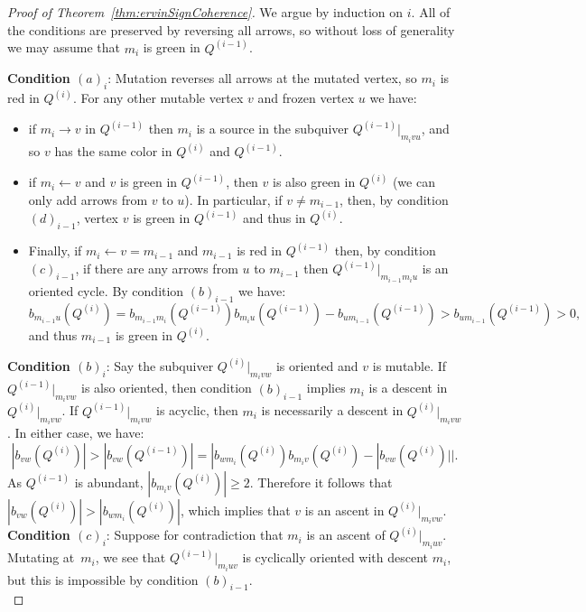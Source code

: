 \documentclass[12pt]{amsart}
\theoremstyle{definition}
\theoremstyle{remark}
\numberwithin{equation}{section}
\begin{document}
\begin{proof}[Proof of Theorem~\ref{thm:ervinSignCoherence}]
We argue by induction on $i$. 
All of the conditions are preserved by reversing all arrows, so without loss of generality we may assume that $m_i$ is green in $Q^{(i-1)}$. %


\textbf{Condition $(a)_i$}: 
Mutation reverses all arrows at the mutated vertex, so $m_i$ is red in $Q^{(i)}$.
For any other mutable vertex $v$ and frozen vertex $u$ we have:
\begin{itemize}
\item if $m_i \rightarrow v$ in $Q^{(i-1)}$ then $m_i$ is a source in the subquiver $Q^{(i-1)}|_{m_ivu}$, and so $v$ has the same color in $Q^{(i)}$ and $Q^{(i-1)}$. 
\item if $m_i \leftarrow v$ and $v$ is green in $Q^{(i-1)}$, then $v$ is also green in $Q^{(i)}$ (we can only add arrows from $v$ to $u$). In particular, if $v \neq m_{i-1}$, then, by condition $(d)_{i-1}$, vertex $v$ is green in $Q^{(i-1)}$ and thus in $Q^{(i)}$.
\item Finally, if $m_i \leftarrow v=m_{i-1}$ and $m_{i-1}$ is red in $Q^{(i-1)}$ then, by condition $(c)_{i-1}$, if there are any arrows from $u$ to $m_{i-1}$ then $Q^{(i-1)}|_{m_{i-1}m_iu}$ is an oriented cycle. 
By condition $(b)_{i-1}$ we have:
$$b_{m_{i-1}u}(Q^{(i)}) = b_{m_{i-1}m_i}(Q^{(i-1)})b_{m_iu}(Q^{(i-1)}) - b_{um_{i-1}}(Q^{(i-1)})> b_{um_{i-1}}(Q^{(i-1)})> 0,$$
and thus $m_{i-1}$ is green in $Q^{(i)}$. \\
\end{itemize}

\textbf{Condition $(b)_i$}:
Say the subquiver $Q^{(i)}|_{m_ivw}$ is oriented and $v$ is mutable.
If $Q^{(i-1)}|_{m_ivw}$ is also oriented, then condition $(b)_{i-1}$ implies $m_i$ is a descent in $Q^{(i)}|_{m_ivw}$.
If $Q^{(i-1)}|_{m_ivw}$ is acyclic, then $m_i$ is necessarily a descent in $Q^{(i)}|_{m_ivw}$.
In either case, we have:
$$|b_{vw}(Q^{(i)})| > |b_{vw}(Q^{(i-1)})| = |b_{wm_i}(Q^{(i)}) b_{m_iv}(Q^{(i)}) - |b_{vw}(Q^{(i)})||.$$
As $Q^{(i-1)}$ is abundant, $|b_{m_iv}(Q^{(i)})| \geq 2$. 
Therefore it follows that $|b_{vw}(Q^{(i)})| > |b_{wm_i}(Q^{(i)})|$, which implies that $v$ is an ascent in $Q^{(i)}|_{m_ivw}$.
\\

\textbf{Condition $(c)_i$}:
Suppose for contradiction that $m_i$ is an ascent of $Q^{(i)}|_{m_iuv}$.
Mutating at~$m_i$, we see that $Q^{(i-1)}|_{m_iuv}$ is cyclically oriented with descent $m_i$, but this is impossible by condition $(b)_{i-1}$.\\



\end{proof}
\end{document}
